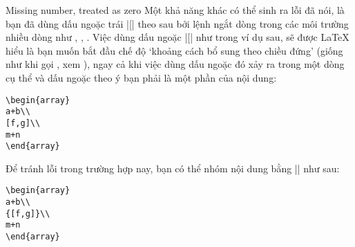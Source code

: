 \begin{error}{Missing number, treated as zero}
Một khả năng khác có thể sinh ra lỗi đã nói, là bạn đã dùng dấu ngoặc trái |[|
theo sau bởi lệnh ngắt dòng \cn{\\} trong các môi trường nhiều dòng như
, , . Việc dùng dấu ngoặc |[| như trong
ví dụ sau, sẽ được \LaTeX{} hiểu là bạn muốn bắt đầu chế độ `khoảng cách bổ
sung theo chiều đứng' (giống như khi gọi \cn{\\[2mm]}, xem \cite[\S C.1.6]{lamport}),
ngay cả khi việc dùng dấu ngoặc đó xảy ra trong một dòng cụ thể và dấu ngoặc
theo ý bạn phải là một phần của nội dung:
\begin{verbatim}
\begin{array}
a+b\\
[f,g]\\
m+n
\end{array}
\end{verbatim}
Để tránh lỗi trong trường hợp nay, bạn có thể nhóm nội dung bằng |{}| như sau:
\begin{verbatim}
\begin{array}
a+b\\
{[f,g]}\\
m+n
\end{array}
\end{verbatim}
\end{error}

